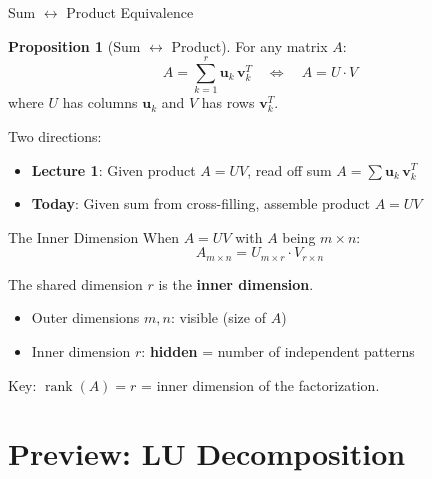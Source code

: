 \documentclass[10pt]{beamer}
\theoremstyle{definition}
\newtheorem{prop}{Proposition}[section]
\newcommand{\x}[1]{\alert{\textbf{#1}}}
\begin{document}
\begin{frame}{Sum $\leftrightarrow$ Product Equivalence}
\begin{prop}[Sum $\leftrightarrow$ Product]
For any matrix $A$:
$$A = \sum_{k=1}^r \mathbf{u}_k\,\mathbf{v}_k^T \quad \Longleftrightarrow \quad A = U \cdot V$$
where $U$ has columns $\mathbf{u}_k$ and $V$ has rows $\mathbf{v}_k^T$.
\end{prop}

\vfill
Two directions:
\begin{itemize}
\item \textbf{Lecture 1}: Given product $A = UV$, read off sum $A = \sum \mathbf{u}_k\,\mathbf{v}_k^T$
\item \textbf{Today}: Given sum from cross-filling, assemble product $A = UV$
\end{itemize}
\end{frame}

\begin{frame}{The Inner Dimension}
When $A = UV$ with $A$ being $m \times n$:
$$A_{m \times n} = U_{m \times \boxed{r}} \cdot V_{\boxed{r} \times n}$$

The shared dimension $r$ is the \x{inner dimension}.

\vfill
\begin{itemize}
\item Outer dimensions $m, n$: visible (size of $A$)
\item Inner dimension $r$: \x{hidden} = number of independent patterns
\end{itemize}

\vfill
Key: $\operatorname{rank}(A) = r$ = inner dimension of the factorization.
\end{frame}

\section{Preview: LU Decomposition}
\end{document}
